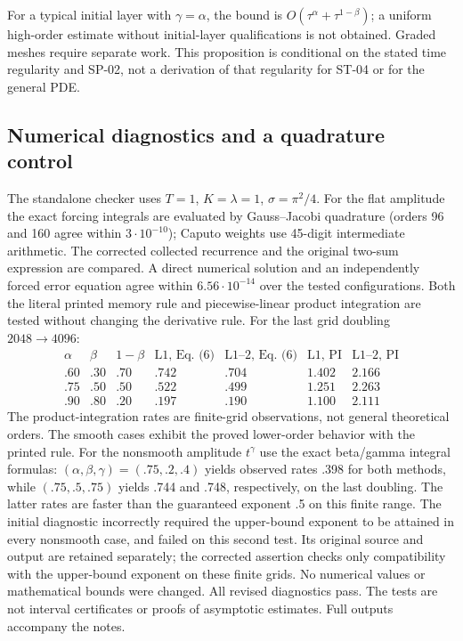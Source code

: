 \documentclass[11pt,a4paper]{amsart}
\theoremstyle{remark}
\theoremstyle{plain}
\theoremstyle{remark}
\numberwithin{equation}{section}
\begin{document}
For a typical initial layer with $\gamma=\alpha$, the bound is $O(\tau^\alpha+\tau^{1-\beta})$; a uniform high-order estimate without initial-layer qualifications is not obtained. Graded meshes require separate work. This proposition is conditional on the stated time regularity and SP-02, not a derivation of that regularity for ST-04 or for the general PDE.

\subsection{Numerical diagnostics and a quadrature control}
The standalone checker uses $T=1$, $K=\lambda=1$, $\sigma=\pi^2/4$. For the flat amplitude the exact forcing integrals are evaluated by Gauss--Jacobi quadrature (orders 96 and 160 agree within $3\cdot10^{-10}$); Caputo weights use 45-digit intermediate arithmetic. The corrected collected recurrence and the original two-sum expression are compared. A direct numerical solution and an independently forced error equation agree within $6.56\cdot10^{-14}$ over the tested configurations. Both the literal printed memory rule and piecewise-linear product integration are tested without changing the derivative rule. For the last grid doubling $2048\to4096$:
\[
\begin{array}{cc|c|cc|cc}
\alpha&\beta&1-\beta&\text{L1, Eq. (6)}&\text{L1--2, Eq. (6)}&\text{L1, PI}&\text{L1--2, PI}\\\hline
 .60&.30&.70&.742&.704&1.402&2.166\\
 .75&.50&.50&.522&.499&1.251&2.263\\
 .90&.80&.20&.197&.190&1.100&2.111
\end{array}
\]
The product-integration rates are finite-grid observations, not general theoretical orders. The smooth cases exhibit the proved lower-order behavior with the printed rule. For the nonsmooth amplitude $t^\gamma$ use the exact beta/gamma integral formulas: $(\alpha,\beta,\gamma)=(.75,.2,.4)$ yields observed rates .398 for both methods, while $(.75,.5,.75)$ yields .744 and .748, respectively, on the last doubling. The latter rates are faster than the guaranteed exponent .5 on this finite range. The initial diagnostic incorrectly required the upper-bound exponent to be attained in every nonsmooth case, and failed on this second test. Its original source and output are retained separately; the corrected assertion checks only compatibility with the upper-bound exponent on these finite grids. No numerical values or mathematical bounds were changed. All revised diagnostics pass. The tests are not interval certificates or proofs of asymptotic estimates. Full outputs accompany the notes.
\end{document}
